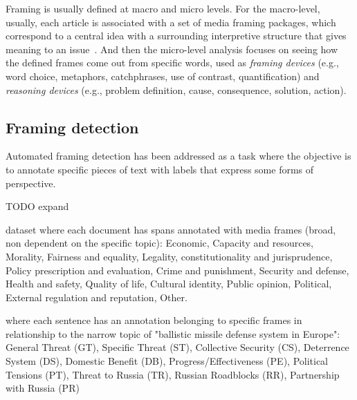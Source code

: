 Framing is usually defined at macro and micro levels.
For the macro-level, usually, each article is associated with a set of media framing packages, which correspond to a central idea with a surrounding interpretive structure that gives meaning to an issue~\cite{gamson1989media}. And then the micro-level analysis focuses on seeing how the defined frames come out from specific words, used as \textit{framing devices} (e.g., word choice, metaphors, catchphrases, use of contrast, quantification) and \textit{reasoning devices} (e.g., problem definition, cause, consequence, solution, action).

\subsection{Framing detection}
\label{ssec:lit_framing_auto}

Automated framing detection has been addressed as a task where the objective is to annotate specific pieces of text with labels that express some forms of perspective.

TODO expand


\cite{card2015media} dataset where each document has spans annotated with media frames (broad, non dependent on the specific topic): Economic, Capacity and resources, Morality, Fairness and equality, Legality, constitutionality and jurisprudence, Policy prescription and evaluation, Crime and punishment, Security and defense, Health and safety, Quality of life, Cultural identity, Public opinion, Political, External regulation and reputation, Other.

\cite{morstatter2018identifying} where each sentence has an annotation belonging to specific frames in relationship to the narrow topic of "ballistic missile defense system in Europe": General Threat (GT), Specific Threat (ST), Collective Security (CS), Deterrence System (DS), Domestic Benefit (DB), Progress/Effectiveness (PE), Political Tensions (PT), Threat to Russia (TR), Russian Roadblocks (RR), Partnership with Russia (PR)




